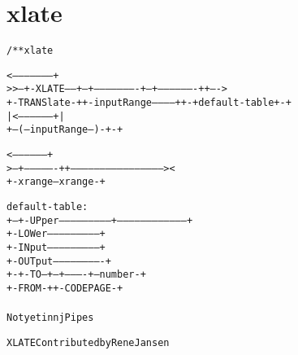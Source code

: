 \section{xlate}
\begin{shaded}
\begin{alltt}
/** xlate

                                                <---------------------+
   >>--+-XLATE-----+--+----------------------+---+-------------------++---->
       +-TRANSlate-+  +-inputRange-----------+   +-+ default-table +-+
                      | <------------------+ |
                      +---(--inputRange--)-+-+

      <------------------+
   >---+----------------++------------------------------------------------><
       +-xrange--xrange-+

   default-table:
   +--+-UPper--------------------------+-----------------------------------+
      +-LOWer--------------------------+
      +-INput--------------------------+
   {  +-OUTput-------------------------+  }
   {  +-+-TO---+--+----------+--number-+  }
   {    +-FROM-+  +-CODEPAGE-+            }
   {                                      }
   { Not yet in njPipes                   }

  XLATE Contributed by Rene Jansen

\end{alltt}
\end{shaded}
